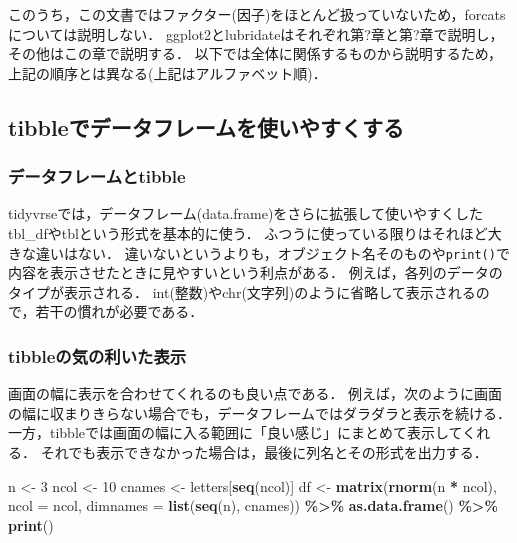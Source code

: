 \documentclass[
]{article}
\newenvironment{Shaded}{\begin{snugshade}}{\end{snugshade}}
\newcommand{\AttributeTok}[1]{\textcolor[rgb]{0.13,0.29,0.53}{#1}}
\newcommand{\DecValTok}[1]{\textcolor[rgb]{0.00,0.00,0.81}{#1}}
\newcommand{\FunctionTok}[1]{\textcolor[rgb]{0.13,0.29,0.53}{\textbf{#1}}}
\newcommand{\NormalTok}[1]{#1}
\newcommand{\OtherTok}[1]{\textcolor[rgb]{0.56,0.35,0.01}{#1}}
\newcommand{\SpecialCharTok}[1]{\textcolor[rgb]{0.81,0.36,0.00}{\textbf{#1}}}
\begin{document}
このうち，この文書ではファクター(因子)をほとんど扱っていないため，forcatsについては説明しない．
ggplot2とlubridateはそれぞれ第?章と第?章で説明し，その他はこの章で説明する．
以下では全体に関係するものから説明するため，上記の順序とは異なる(上記はアルファベット順)．

\hypertarget{tibbleux3067ux30c7ux30fcux30bfux30d5ux30ecux30fcux30e0ux3092ux4f7fux3044ux3084ux3059ux304fux3059ux308b}{%
\subsection{tibbleでデータフレームを使いやすくする}\label{tibbleux3067ux30c7ux30fcux30bfux30d5ux30ecux30fcux30e0ux3092ux4f7fux3044ux3084ux3059ux304fux3059ux308b}}

\hypertarget{ux30c7ux30fcux30bfux30d5ux30ecux30fcux30e0ux3068tibble}{%
\subsubsection{データフレームとtibble}\label{ux30c7ux30fcux30bfux30d5ux30ecux30fcux30e0ux3068tibble}}

tidyvrseでは，データフレーム(data.frame)をさらに拡張して使いやすくした tbl\_dfやtblという形式を基本的に使う．
ふつうに使っている限りはそれほど大きな違いはない．
違いないというよりも，オブジェクト名そのものや\texttt{print()}で内容を表示させたときに見やすいという利点がある．
例えば，各列のデータのタイプが表示される．
int(整数)やchr(文字列)のように省略して表示されるので，若干の慣れが必要である．

\hypertarget{tibbleux306eux6c17ux306eux5229ux3044ux305fux8868ux793a}{%
\subsubsection{tibbleの気の利いた表示}\label{tibbleux306eux6c17ux306eux5229ux3044ux305fux8868ux793a}}

画面の幅に表示を合わせてくれるのも良い点である．
例えば，次のように画面の幅に収まりきらない場合でも，データフレームではダラダラと表示を続ける．
一方，tibbleでは画面の幅に入る範囲に「良い感じ」にまとめて表示してくれる．
それでも表示できなかった場合は，最後に列名とその形式を出力する．

\begin{Shaded}
\begin{Highlighting}[]
\NormalTok{n }\OtherTok{\textless{}{-}} \DecValTok{3}
\NormalTok{ncol }\OtherTok{\textless{}{-}} \DecValTok{10}
\NormalTok{cnames }\OtherTok{\textless{}{-}}\NormalTok{ letters[}\FunctionTok{seq}\NormalTok{(ncol)]}
\NormalTok{df }\OtherTok{\textless{}{-}} 
  \FunctionTok{matrix}\NormalTok{(}\FunctionTok{rnorm}\NormalTok{(n }\SpecialCharTok{*}\NormalTok{ ncol), }\AttributeTok{ncol =}\NormalTok{ ncol, }\AttributeTok{dimnames =} \FunctionTok{list}\NormalTok{(}\FunctionTok{seq}\NormalTok{(n), cnames)) }\SpecialCharTok{\%\textgreater{}\%}
  \FunctionTok{as.data.frame}\NormalTok{() }\SpecialCharTok{\%\textgreater{}\%}
  \FunctionTok{print}\NormalTok{()}
\end{Highlighting}
\end{Shaded}
\end{document}
